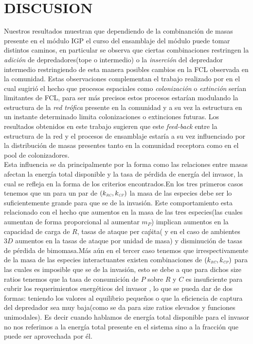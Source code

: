 \section{DISCUSION}

Nuestros resultados muestran que dependiendo de la combinanci\'on de masas presente en el m\'odulo IGP el curso del ensamblaje del m\'odulo puede tomar distintos caminos, en particular se observa que ciertas combinaciones restringen la \emph{adici\'on} de depredadores(tope o intermedio) o la \emph{inserci\'on} del depredador intermedio restringiendo de esta manera posibles cambios en la FCL observada en la comunidad. Estas observaciones complementan el trabajo realizado por \citet{holt2002food} en el cual sugiri\'o el hecho que procesos espaciales como \emph{colonizaci\'on} o \emph{extinci\'on} ser\'ian limitantes de FCL, para ser m\'as precisos estos procesos estar\'ian modulando la estructura de la \emph{red tr\'ofica} presente en la comunidad y a su vez la estructura en un instante determinado limita colonizaciones o extinciones futuras\citep{pawar2009community,holt2002food}.  Los resultados obtenidos en este trabajo sugieren que este \emph{feed-back} entre la estructura de la red y el procesos de ensamblaje estar\'ia a su vez influenciado por la distribuci\'on de masas presentes tanto en la comunidad receptora como en el pool de colonizadores.\\

Esta influencia se da principalmente por la forma como las relaciones entre masas afectan la energ\'ia total disponible y la tasa de p\'erdida de energ\'ia del invasor, la cual se refleja en la forma de los criterios encontrados.En los tres primeros casos tenemos que un para un par de $(k_{\textit{\tiny RC}},k_{\textit{\tiny CP}})$ la masa de las especies debe ser lo suficientemente grande para que se de la invasi\'on. Este comportamiento esta relacionado con el hecho que aumentos en la masa de las tres especies(las cuales aumentan de forma proporcional al aumentar $m_P$) implican aumentos en la capacidad de carga de $R$, tasas de ataque per ca\'pita( y en el caso de ambientes $3D$ aumentos en la tasas de ataque por unidad de masa) y disminuci\'on de tasas de p\'erdida de bimomasa.M\'as a\'un en el tercer caso tenemos que irrespectivamente de la masa de las especies interactuantes existen combinaciones de $(k_{\textit{\tiny RC}},k_{\textit{\tiny CP}})$ para las cuales es imposible que se de la invasi\'on, esto se debe a que para dichos size ratios tenemos que la tasa de consumici\'on de $P$ sobre $R$ y $C$ es insuficiente para cubrir los requerimientos energ\'eticos del invasor , lo que se pueda dar de dos formas: teniendo los valores al equilibrio  peque\~nos o que la eficiencia de captura del depredador sea muy baja(como se da para size ratios elevados y funciones unimodales). Es decir cuando hablamos de energ\'ia total disponible para el invasor no nos referimos a la energ\'ia total presente en el sistema sino a la fracci\'on que puede ser aprovechada por \'el.\\

